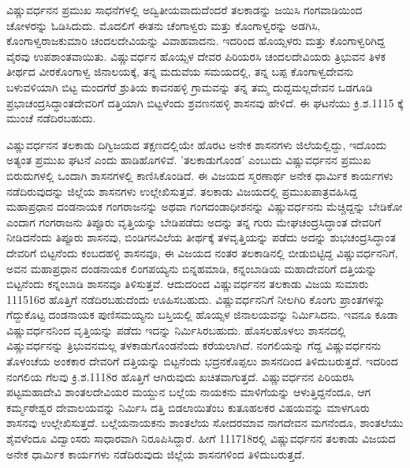 ವಿಷ್ಣುವರ್ಧನನ ಪ್ರಮುಖ ಸಾಧನೆಗಳಲ್ಲಿ ಅದ್ವಿತೀಯವಾದುದೆಂದರೆ ತಲಕಾಡನ್ನು ಜಯಿಸಿ ಗಂಗವಾಡಿಯಿಂದ ಚೋಳರನ್ನು ಓಡಿಸಿದುದು. ಮೊದಲಿಗೆ ಈತನು ಚೆಂಗಾಳ್ವರು ಮತ್ತು ಕೊಂಗಾಳ್ವರನ್ನು ಅಡಗಿಸಿ, ಕೊಂಗಾಳ್ವರಾಜಕುಮಾರಿ ಚಂದಲದೇವಿಯನ್ನು ವಿವಾಹವಾದನು. ಇದರಿಂದ ಹೊಯ್ಸಳರು ಮತ್ತು ಕೊಂಗಾಳ್ವರಿಗಿದ್ದ ವೈರವು ಉಪಶಾಂತವಾಯಿತು. ವಿಷ್ಣುವರ್ಧನ ಹೊಯ್ಸಳ ದೇವರ ಪಿರಿಯರಸಿ ಚಂದಲದೇವಿಯರು ತ್ರಿಭುವನ ತಿಳಕ ತೀರ್ಥದ ವೀರಕೊಂಗಾಳ್ವ ಜಿನಾಲಯಕ್ಕೆ, ತನ್ನ ಮದುವೆಯ ಸಮಯದಲ್ಲಿ, ತನ್ನ ಬಪ್ಪ ಕೊಂಗಾಳ್ವದೇವನು ಬಳುವಳಿಯಾಗಿ ಬಿಟ್ಟ ಮಂದಗೆರೆ ಶ್ರುತಿಯ ಕಾವನಹಳ್ಳಿ ಗ್ರಾಮವನ್ನು ತನ್ನ ತಮ್ಮ ದುದ್ದಮಲ್ಲದೇವನ ಒಡಗೂಡಿ ಪ್ರಭಾಚಂದ್ರಸಿದ್ಧಾಂತದೇವರಿಗೆ ದತ್ತಿಯಾಗಿ ಬಿಟ್ಟಳೆಂದು ಶ್ರವಣನಹಳ್ಳಿ ಶಾಸನವು ಹೇಳಿದೆ. ಈ ಘಟನೆಯು ಕ್ರಿ.ಶ.1115 ಕ್ಕೆ ಮುಂಚೆ ನಡೆದಿರಬಹುದು.

ವಿಷ್ಣುವರ್ಧನನ ತಲಕಾಡು ದಿಗ್ವಿಜಯದ ತಕ್ಷಣದಲ್ಲಿಯೇ ಹೊರಟ ಅನೇಕ ಶಾಸನಗಳು ಜಿಲೆಯಲ್ಲಿದ್ದು, ಇದೊಂದು ಅತ್ಯಂತ ಪ್ರಮುಖ ಘಟನೆ ಎಂದು ಹಾಡಿಹೊಗಳಿವೆ. 'ತಲಕಾಡುಗೊಂಡ' ಎಂಬುದು ವಿಷ್ಣುವರ್ಧನನ ಪ್ರಮುಖ ಬಿರುದುಗಳಲ್ಲಿ ಒಂದಾಗಿ ಶಾಸನಗಳಲ್ಲಿ ಕಾಣಿಸಿಕೊಂಡಿದೆ. ಈ ವಿಜಯದ ಸ್ಮರಣಾರ್ಥ ಅನೇಕ ಧಾರ್ಮಿಕ ಕಾರ್ಯಗಳು ನಡೆದಿರುವುದನ್ನು ಜಿಲ್ಲೆಯ ಶಾಸನಗಳು ಉಲ್ಲೇಖಿಸುತ್ತವೆ. ತಲಕಾಡು ವಿಜಯದಲ್ಲಿ ಪ್ರಮುಖಪಾತ್ರವಹಿಸಿದ್ದ ಮಹಾಪ್ರಧಾನ ದಂಡನಾಯಕ ಗಂಗರಾಜನನ್ನು ಅಥವಾ ಗಂಗದಂಡಾಧೀಶನನ್ನು ವಿಷ್ಣುವರ್ಧನನು ಮೆಚ್ಚಿದ್ದನ್ನು ಬೇಡಿಕೋ ಎಂದಾಗ ಗಂಗರಾಜನು ತಿಪ್ಪೂರು ವೃತ್ತಿಯನ್ನು ಬೇಡಿಪಡೆದು ಅದನ್ನು ತನ್ನ ಗುರು ಮೇಘಚಂದ್ರಸಿದ್ಧಾಂತ ದೇವರಿಗೆ ನೀಡಿದನೆಂದು ತಿಪ್ಪೂರು ಶಾಸನವು, ಬಿಂಡಿಗನವಿಲೆಯ ತೀರ್ಥಕ್ಕೆ ತಳವೃತ್ತಿಯನ್ನು ಪಡೆದು ಅದನ್ನು ಶುಭಚಂದ್ರಸಿದ್ಧಾಂತ ದೇವರಿಗೆ ಬಿಟ್ಟನೆಂದು ಕಂಬದಹಳ್ಳಿ ಶಾಸನವೂ, ಈ ವಿಜಯದ ನಂತರ ತಲಕಾಡಿನಲ್ಲಿ ಬೀಡುಬಿಟ್ಟಿದ್ದ ವಿಷ್ಣುವರ್ಧನನಿಗೆ, ಅವನ ಮಹಾಪ್ರಧಾನ ದಂಡನಾಯಕ ಲಿಂಗಪಯ್ಯನು ಬಿನ್ನಹಮಾಡಿ, ಕನ್ನಂಬಾಡಿಯ ಮಹಾದೇವರಿಗೆ ದತ್ತಿಯನ್ನು ಬಿಟ್ಟನೆಂದು ಕನ್ನಂಬಾಡಿ ಶಾಸನವೂ ತಿಳಿಸುತ್ತವೆ. ಆದುದರಿಂದ ವಿಷ್ಣುವರ್ಧನನ ತಲಕಾಡು ವಿಜಯ ಸುಮಾರು 1115\enginline{-}16ರ ಹೊತ್ತಿಗೆ ನಡೆದಿರಬಹುದೆಂದು ಊಹಿಸಬಹುದು. ವಿಷ್ಣುವರ್ಧನನಿಗೆ ನೀಲಗಿರಿ ಕೊಂಗು ಪ್ರಾಂತಗಳನ್ನು ಗೆದ್ದುಕೊಟ್ಟ ದಂಡನಾಯಕ ಪುಣಿಸಮಯ್ಯನು ಬಸ್ತಿಯಲ್ಲಿ ಹೊಯ್ಸಳ ಜಿನಾಲಯವನ್ನು ನಿರ್ಮಿಸಿದನು. ಇವನೂ ಕೂಡಾ ವಿಷ್ಣುವರ್ಧನನಿಂದ ವೃತ್ತಿಯನ್ನು ಪಡೆದು ಇದನ್ನು ನಿರ್ಮಿಸಿರಬಹುದು. ಹೊಸಲಹೊಳಲು ಶಾಸನದಲ್ಲಿ ವಿಷ್ಣುವರ್ಧನನ್ನು ತ್ರಿಭುವನಮಲ್ಲ ತಳಕಾಡುಗೊಂಡನೆಂದು ಕರೆಯಲಾಗಿದೆ. ನಂಗಲಿಯನ್ನು ಗೆದ್ದ ವಿಷ್ಣುವರ್ಧನನು ತೊಳಂಚೆಯ ಅಂಕಕಾರ ದೇವರಿಗೆ ದತ್ತಿಯನ್ನು ಬಿಟ್ಟನೆಂದು ಭದ್ರನಕೊಪ್ಪಲು ಶಾಸನದಿಂದ ತಿಳಿದು\-ಬರುತ್ತದೆ. ಇದರಿಂದ ನಂಗಲಿಯ ಗೆಲವು ಕ್ರಿ.ಶ.1118ರ ಹೊತ್ತಿಗೆ ಆಗಿರುವುದು ಖಚಿತವಾಗುತ್ತದೆ. ವಿಷ್ಣುವರ್ಧನನ ಪಿರಿಯರಸಿ ಪಟ್ಟಮಹಾದೇವಿ ಶಾಂತಲದೇವಿಯರ ಮಯ್ದುನ ಬಲ್ಲೆಯ ನಾಯಕನು ಮಾಳಿಗೆಯನ್ನು ಆಳುತ್ತಿದ್ದನೆಂದೂ, ಆಗ ಕರ್ಮ್ಮಠೇಶ್ವರ ದೇವಾಲಯವನ್ನು ನಿರ್ಮಿಸಿ ದತ್ತಿ ಬಿಡಲಾಯಿತೆಂಬ ಕುತೂಹಲಕರ ವಿಷಯವನ್ನು ಮಾಳಗೂರು ಶಾಸನವು ಉಲ್ಲೇಖಿಸುತ್ತದೆ. ಬಲ್ಲೆಯನಾಯಕನು ಶಾಂತಲೆಯ ಸೋದರಮಾವ ನಾಗದೇವನ ಮಗನೆಂದೂ, ಶಾಂತಲೆಯು ಶೈವಳೆಂದೂ ವಿದ್ವಾಂಸರು ಸಾಧಾರವಾಗಿ ನಿರೂಪಿಸಿದ್ದಾರೆ. ಹೀಗೆ 1117\enginline{-}18ರಲ್ಲಿ ವಿಷ್ಣುವರ್ಧನನ ತಲಕಾಡು ವಿಜಯದ ಅನೇಕ ಧಾರ್ಮಿಕ ಕಾರ್ಯಗಳು ನಡೆದಿರುವುದು ಜಿಲ್ಲೆಯ ಶಾಸನಗಳಿಂದ ತಿಳಿದುಬರುತ್ತದೆ.

